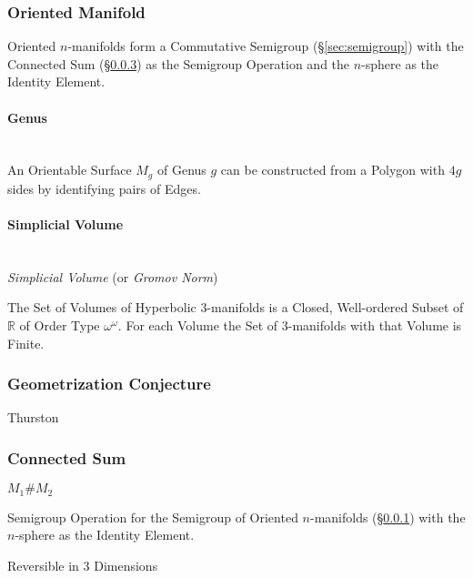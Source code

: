 \subsubsection{Oriented Manifold}\label{sec:oriented_manifold}

Oriented $n$-manifolds form a Commutative Semigroup
(\S\ref{sec:semigroup}) with the Connected Sum
(\S\ref{sec:connected_sum}) as the Semigroup Operation and the
$n$-sphere as the Identity Element.



\paragraph{Genus}\label{sec:genus}
\hfill \\

An Orientable Surface $M_g$ of Genus $g$ can be constructed from a
Polygon with $4g$ sides by identifying pairs of Edges.



\paragraph{Simplicial Volume}\label{sec:simplicial_volume}
\hfill \\

\emph{Simplicial Volume} (or \emph{Gromov Norm})

The Set of Volumes of Hyperbolic 3-manifolds is a Closed, Well-ordered
Subset of $\mathbb{R}$ of Order Type $\omega^\omega$. For each Volume
the Set of 3-manifolds with that Volume is Finite.



\subsubsection{Geometrization Conjecture}
\label{sec:geometrization_conjecture}

Thurston



\subsubsection{Connected Sum}\label{sec:connected_sum}

$M_1 \# M_2$

Semigroup Operation for the Semigroup of Oriented $n$-manifolds
(\S\ref{sec:oriented_manifold}) with the $n$-sphere as the Identity
Element.

Reversible in 3 Dimensions

